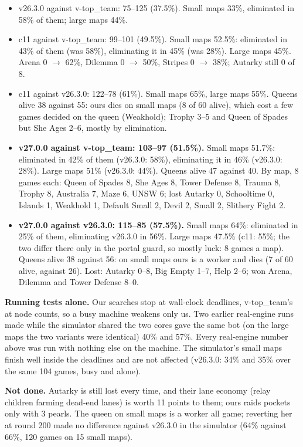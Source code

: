 \documentclass[11pt,a4paper]{article}
\begin{document}
\begin{itemize}
      \item v26.3.0 against v-top\_team: 75--125 (37.5\%). Small maps 33\%, eliminated in 58\% of them; large maps 44\%.
      \item c11 against v-top\_team: 99--101 (49.5\%). Small maps 52.5\%: eliminated in 43\% of them (was 58\%), eliminating it
            in 45\% (was 28\%). Large maps 45\%. Arena 0 $\rightarrow$ 62\%, Dilemma 0 $\rightarrow$ 50\%, Stripes 0 $\rightarrow$
            38\%; Autarky still 0 of 8.
      \item c11 against v26.3.0: 122--78 (61\%). Small maps 65\%, large maps 55\%. Queens alive 38 against 55: ours dies on small
            maps (8 of 60 alive), which cost a few games decided on the queen (Weakhold); Trophy 3--5 and Queen of Spades but
            She Ages 2--6, mostly by elimination.
      \item \textbf{v27.0.0 against v-top\_team: 103--97 (51.5\%).} Small maps 51.7\%: eliminated in 42\% of them (v26.3.0:
            58\%), eliminating it in 46\% (v26.3.0: 28\%). Large maps 51\% (v26.3.0: 44\%). Queens alive 47 against 40. By map,
            8 games each: Queen of Spades 8, She Ages 8, Tower Defense 8, Trauma 8, Trophy 8, Australia 7, Maze 6, UNSW 6; lost
            Autarky 0, Schooltime 0, Islands 1, Weakhold 1, Default Small 2, Devil 2, Small 2, Slithery Fight 2.
      \item \textbf{v27.0.0 against v26.3.0: 115--85 (57.5\%).} Small maps 64\%: eliminated in 25\% of them, eliminating
            v26.3.0 in 56\%. Large maps 47.5\% (c11: 55\%; the two differ there only in the portal guard, so mostly luck: 8 games
            a map). Queens alive 38 against 56: on small maps ours is a worker and dies (7 of 60 alive, against 26). Lost:
            Autarky 0--8, Big Empty 1--7, Help 2--6; won Arena, Dilemma and Tower Defense 8--0.
\end{itemize}
\textbf{Running tests alone.} Our searches stop at wall-clock deadlines, v-top\_team's at node counts, so a busy machine
weakens only us. Two earlier real-engine runs made while the simulator shared the two cores gave the same bot (on the large
maps the two variants were identical) 40\% and 57\%. Every real-engine number above was run with nothing else on the
machine. The simulator's small maps finish well inside the deadlines and are not affected (v26.3.0: 34\% and 35\% over the
same 104 games, busy and alone).

\textbf{Not done.} Autarky is still lost every time, and their lane economy (relay children farming dead-end lanes) is
worth 11 points to them; ours raids pockets only with 3 pearls. The queen on small maps is a worker all game; reverting her
at round 200 made no difference against v26.3.0 in the simulator (64\% against 66\%, 120 games on 15 small maps).
\end{document}
